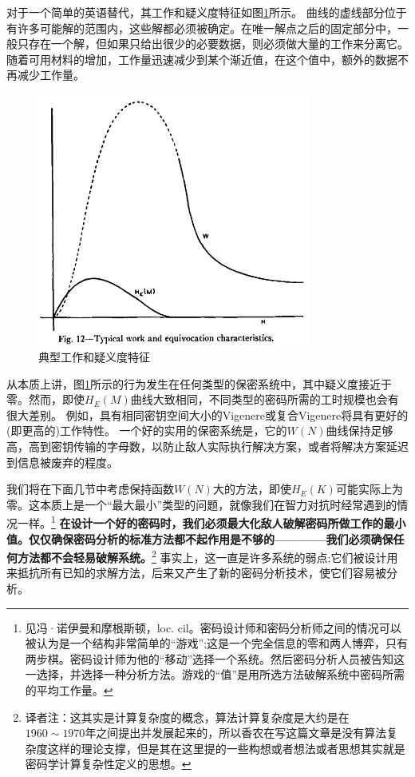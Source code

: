 \documentclass[]{article}
\begin{document}
对于一个简单的英语替代，其工作和疑义度特征如图\ref{fig:fig12}所示。
曲线的虚线部分位于有许多可能解的范围内，这些解都必须被确定。在唯一解点之后的固定部分中，一般只存在一个解，但如果只给出很少的必要数据，则必须做大量的工作来分离它。随着可用材料的增加，工作量迅速减少到某个渐近值，在这个值中，额外的数据不再减少工作量。

\begin{figure}[htbp]
	\centering
	\includegraphics[width=0.8\textwidth]{fig12.png}
	\caption{典型工作和疑义度特征}
	\label{fig:fig12}
\end{figure}

从本质上讲，图\ref{fig:fig12}所示的行为发生在任何类型的保密系统中，其中疑义度接近于零。然而，即使$H_E(M)$曲线大致相同，不同类型的密码所需的工时规模也会有很大差别。
例如，具有相同密钥空间大小的Vigenere或复合Vigenere将具有更好的(即更高的)工作特性。
一个好的实用的保密系统是，它的$W(N)$曲线保持足够高，高到密钥传输的字母数，以防止敌人实际执行解决方案，或者将解决方案延迟到信息被废弃的程度。

我们将在下面几节中考虑保持函数$W(N)$大的方法，即使$H_E(K)$可能实际上为零。这本质上是一个“最大最小”类型的问题，就像我们在智力对抗时经常遇到的情况一样。\footnote{见冯·诺伊曼和摩根斯顿，loc. cil。密码设计师和密码分析师之间的情况可以被认为是一个结构非常简单的“游戏”;这是一个完全信息的零和两人博弈，只有两步棋。密码设计师为他的“移动”选择一个系统。然后密码分析人员被告知这一选择，并选择一种分析方法。游戏的“值”是用所选方法破解系统中密码所需的平均工作量。}
\textbf{在设计一个好的密码时，我们必须最大化敌人破解密码所做工作的最小值。仅仅确保密码分析的标准方法都不起作用是不够的————我们必须确保任何方法都不会轻易破解系统。}\footnote{译者注：这其实是计算复杂度的概念，算法计算复杂度是大约是在$1960\sim 1970$年之间提出并发展起来的，所以香农在写这篇文章是没有算法复杂度这样的理论支撑，但是其在这里提的一些构想或者想法或者思想其实就是密码学计算复杂性定义的思想。}
事实上，这一直是许多系统的弱点;它们被设计用来抵抗所有已知的求解方法，后来又产生了新的密码分析技术，使它们容易被分析。
\end{document}
